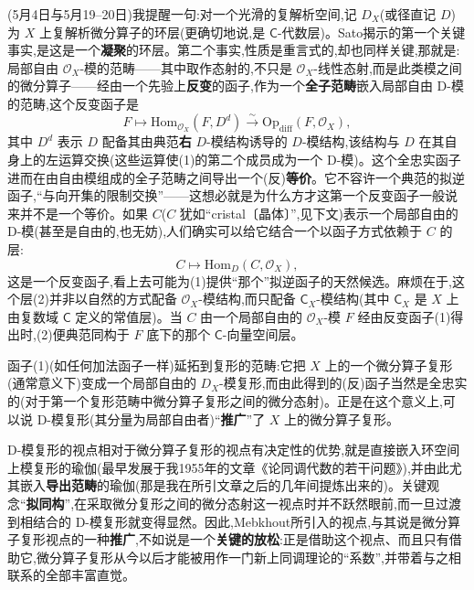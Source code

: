 \dmark{}(5月4日与5月19--20日)我提醒一句:对一个光滑的复解析空间,记 $D_{X}$(或径直记 $D$)为 $X$ 上复解析微分算子的环层(更确切地说,是 $\mathsf{C}$-代数层)。Sato揭示的第一个关键事实,是这是一个\textbf{凝聚}的环层。第二个事实,性质是重言式的,却也同样关键,那就是:局部自由 $\mathcal{O}_{X}$-模的范畴——其中取作态射的,不只是 $\mathcal{O}_{X}$-线性态射,而是此类模之间的微分算子——经由一个先验上\textbf{反变}的函子,作为一个\textbf{全子范畴}嵌入局部自由 D-模的范畴,这个反变函子是
\begin{equation*}
F\longmapsto \mathrm{Hom}_{\mathcal{O}_{X}}(F,D^{d})\xrightarrow{\ \sim\ }\mathrm{Op}_{\mathrm{diff}}(F,\mathcal{O}_{X}),
\tag{1}
\end{equation*}
其中 $D^{d}$ 表示 $D$ 配备其由典范\textbf{右} $D$-模结构诱导的 $D$-模结构,该结构与 $D$ 在其自身上的左运算\dmark{}交换(这些运算使(1)的第二个成员成为一个 D-模)。这个全忠实函子进而在由自由模组成的全子范畴之间导出一个(反)\textbf{等价}。它不容许一个典范的拟逆函子,“与向开集的限制交换”——这想必就是为什么方才这第一个反变函子一般说来并不是一个等价。如果 $C$($C$ 犹如“cristal〔晶体〕”,见下文)表示一个局部自由的 D-模(甚至是自由的,也无妨),人们确实可以给它结合一个以函子方式依赖于 $C$ 的层:
\begin{equation*}
C\longmapsto \mathrm{Hom}_{D}(C,\mathcal{O}_{X}),
\tag{2}
\end{equation*}
这是一个反变函子,看上去可能为(1)提供“那个”拟逆函子的天然候选。麻烦在于,这个层(2)并非以自然的方式配备 $\mathcal{O}_{X}$-模结构,而只配备 $\mathsf{C}_{X}$-模结构(其中 $\mathsf{C}_{X}$ 是 $X$ 上由复数域 $\mathsf{C}$ 定义的常值层)。当 $C$ 由一个局部自由的 $\mathcal{O}_{X}$-模 $F$ 经由反变函子(1)得出时,(2)便典范同构于 $F$ 底下的那个 $\mathsf{C}$-向量空间层。

\noindent 函子(1)(如任何加法函子一样)延拓到复形的范畴:它把 $X$ 上的一个微分算子复形(通常意义下)变成一个局部自由的 $D_{X}$-模复形,而由此得到的(反)函子当然是全忠实的(对于第一个复形范畴中微分算子复形之间的微分态射)。正是在这个意义上,可以说 D-模复形(其分量为局部自由者)“\textbf{推广}”了 $X$ 上的微分算子复形。

\noindent D-模复形的视点相对于微分算子复形的视点有决定性的优势,就是直接嵌入环空间上模复形的瑜伽(最早发展于我1955年的文章《论同调代数的若干问题》),并由此尤其嵌入\textbf{导出范畴}的瑜伽(那是我在所引文章之后的几年间提炼出来的)。关键观念“\textbf{拟同构}”,在采取微分复形之间的微分态射这一视点时并不跃然眼前,而一旦过渡到相结合的 D-模复形就变得显然。因此,Mebkhout所引入的视点,与其说是微分算子复形视点的一种\textbf{推广},不如说是一个\textbf{关键的放松}:\dmark{}正是借助这个视点、而且只有借助它,微分算子复形从今以后才能被用作一门新上同调理论的“系数”,并带着与之相联系的全部丰富直觉。

